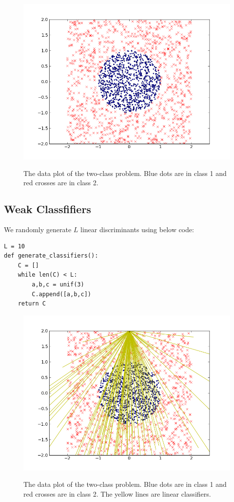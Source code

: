 \documentclass[]{article}  %
\begin{document}
\begin{figure}[h]
\begin{center}
\includegraphics[scale=.6]{plane.png}\label{fig:axis}
\end{center}
\caption{The data plot of the two-class problem. Blue dots are in class 1 and red crosses are in class 2. }
\end{figure}%

\subsection{Weak Classfifiers}
We randomly generate $L$ linear discriminants using below code:
\begin{verbatim}
L = 10
def generate_classifiers():
    C = []
    while len(C) < L:
        a,b,c = unif(3)
        C.append([a,b,c])
    return C
\end{verbatim}

\begin{figure}[h]
\begin{center}
\includegraphics[scale=.6]{plain_with_c.png}\label{fig:axis}
\end{center}
\caption{The data plot of the two-class problem. Blue dots are in class 1 and red crosses are in class 2. The yellow lines are linear classifiers.}
\end{figure}%
\end{document}

